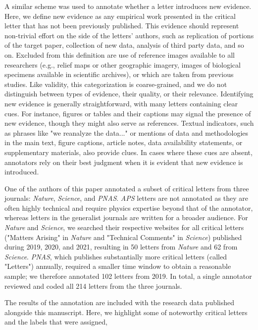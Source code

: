 \documentclass[12pt]{article} %
\begin{document}
A similar scheme was used to annotate whether a letter introduces new evidence.
Here, we define new evidence as any empirical work presented in the critical letter that has not been previously published.
This evidence should represent non-trivial effort on the side of the letters' authors, such as replication of portions of the target paper, collection of new data, analysis of third party data, and so on. 
Excluded from this definition are use of reference images available to all researchers (e.g., relief maps or other geographic imagery, images of biological specimens available in scientific archives), or which are taken from previous studies.
Like validity, this categorization is coarse-grained, and we do not distinguish between types of evidence, their quality, or their relevance. 
Identifying new evidence is generally straightforward, with many letters containing clear cues. 
For instance, figures or tables and their captions may signal the presence of new evidence, though they might also serve as references.
Textual indicators, such as phrases like "we reanalyze the data..." or mentions of data and methodologies in the main text, figure captions, article notes, data availability statements, or supplementary materials, also provide clues. 
In cases where these cues are absent, annotators rely on their best judgment when it is evident that new evidence is introduced.

One of the authors of this paper annotated a subset of critical letters from three journals: \textit{Nature}, \textit{Science}, and \textit{PNAS}. 
\textit{APS} letters are not annotated as they are often highly technical and require physics expertise beyond that of the annotator, whereas letters in the generalist journals are written for a broader audience.
For \textit{Nature} and \textit{Science}, we searched their respective websites for all critical letters ("Matters Arising" in \textit{Nature} and "Technical Comments" in \textit{Science}) published during 2019, 2020, and 2021, resulting in 50 letters from \textit{Nature} and 62 from \textit{Science}. 
\textit{PNAS}, which publishes substantially more critical letters (called "Letters") annually, required a smaller time window to obtain a reasonable sample; we therefore annotated 102 letters from 2019. In total, a single annotator reviewed and coded all 214 letters from the three journals.

The results of the annotation are included with the research data published alongside this manuscript.
Here, we highlight some of noteworthy critical letters and the labels that were assigned,
\end{document}
